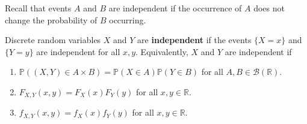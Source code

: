 \documentclass{huhtakm-template-book}
\newcommand{\prob}{\mathbb{P}}
\begin{document}
    Recall that events $A$ and $B$ are independent if the occurrence of $A$ does not change the probability of $B$ occurring.
    \begin{defn}
        Discrete random variables $X$ and $Y$ are \textbf{independent} if the events $\{X=x\}$ and $\{Y=y\}$ are independent for all $x,y$. Equivalently, $X$ and $Y$ are independent if
        \begin{enumerate}
            \item $\prob((X,Y)\in A\times B)=\prob(X\in A)\prob(Y\in B)$ for all $A,B\in\mathcal{B}(\mathbb{R})$.
            \item $F_{X,Y}(x,y)=F_{X}(x)F_{Y}(y)$ for all $x,y\in\mathbb{R}$.
            \item $f_{X,Y}(x,y)=f_{X}(x)f_{Y}(y)$ for all $x,y\in\mathbb{R}$.
        \end{enumerate}
    \end{defn}
\end{document}
